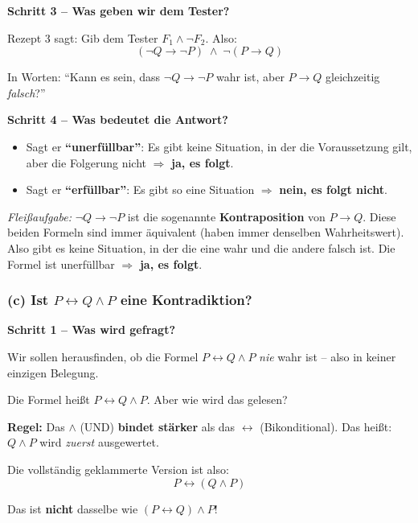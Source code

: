 \documentclass[a4paper,12pt]{article}
\begin{document}
\medskip
\textbf{Schritt 3 -- Was geben wir dem Tester?}

Rezept 3 sagt: Gib dem Tester $F_1 \wedge \neg F_2$. Also:
\[
  (\neg Q \to \neg P) \;\wedge\; \neg(P \to Q)
\]

In Worten: "`Kann es sein, dass $\neg Q \to \neg P$ wahr ist,
aber $P \to Q$ gleichzeitig \emph{falsch}?"'

\medskip
\textbf{Schritt 4 -- Was bedeutet die Antwort?}
\begin{itemize}
\item Sagt er \textbf{"`unerf\"ullbar"'}: Es gibt keine Situation, in
      der die Voraussetzung gilt, aber die Folgerung nicht
      $\Rightarrow$ \textbf{ja, es folgt}.
\item Sagt er \textbf{"`erf\"ullbar"'}: Es gibt so eine Situation
      $\Rightarrow$ \textbf{nein, es folgt nicht}.
\end{itemize}

\medskip
\textit{Flei\ss aufgabe:} $\neg Q \to \neg P$ ist die sogenannte
\textbf{Kontraposition} von $P \to Q$. Diese beiden Formeln sind
immer \"aquivalent (haben immer denselben Wahrheitswert). Also gibt
es keine Situation, in der die eine wahr und die andere falsch ist.
Die Formel ist unerf\"ullbar $\Rightarrow$ \textbf{ja, es folgt}.

\subsubsection*{(c) Ist $P \leftrightarrow Q \wedge P$ eine Kontradiktion?}

\textbf{Schritt 1 -- Was wird gefragt?}

Wir sollen herausfinden, ob die Formel $P \leftrightarrow Q \wedge P$
\emph{nie} wahr ist -- also in keiner einzigen Belegung.

\begin{merkbox}[title={Achtung: Operatorpr\"azedenz!}]
Die Formel hei\ss t $P \leftrightarrow Q \wedge P$. Aber wie wird das gelesen?

\medskip
\textbf{Regel:} Das $\wedge$ (UND) \textbf{bindet st\"arker} als das
$\leftrightarrow$ (Bikonditional). Das hei\ss t: $Q \wedge P$ wird
\emph{zuerst} ausgewertet.

\medskip
Die vollst\"andig geklammerte Version ist also:
\[
  P \leftrightarrow (Q \wedge P)
\]

Das ist \textbf{nicht} dasselbe wie $(P \leftrightarrow Q) \wedge P$!
\end{merkbox}
\end{document}

